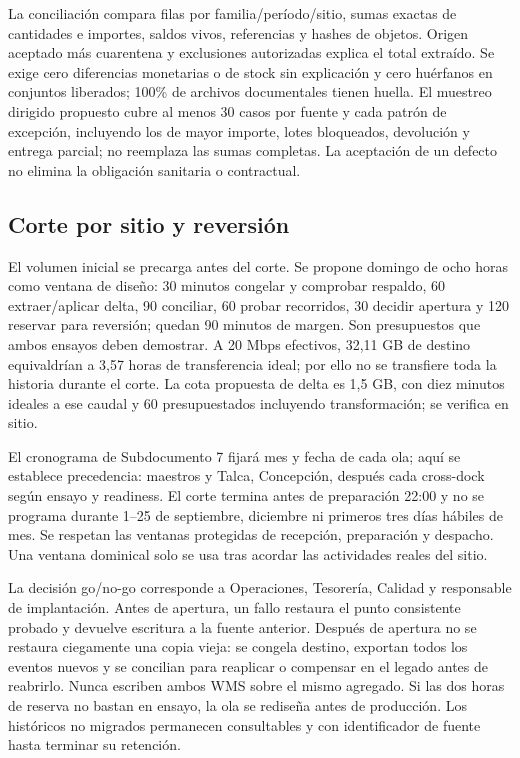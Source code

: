 La conciliación compara filas por familia/período/sitio, sumas exactas de cantidades e importes, saldos vivos, referencias y hashes de objetos. Origen aceptado más cuarentena y exclusiones autorizadas explica el total extraído. Se exige cero diferencias monetarias o de stock sin explicación y cero huérfanos en conjuntos liberados; 100\% de archivos documentales tienen huella. El muestreo dirigido propuesto cubre al menos 30 casos por fuente y cada patrón de excepción, incluyendo los de mayor importe, lotes bloqueados, devolución y entrega parcial; no reemplaza las sumas completas. La aceptación de un defecto no elimina la obligación sanitaria o contractual.

\subsection{Corte por sitio y reversión}
El volumen inicial se precarga antes del corte. Se propone domingo de ocho horas como ventana de diseño: 30 minutos congelar y comprobar respaldo, 60 extraer/aplicar delta, 90 conciliar, 60 probar recorridos, 30 decidir apertura y 120 reservar para reversión; quedan 90 minutos de margen. Son presupuestos que ambos ensayos deben demostrar. A 20 Mbps efectivos, 32,11 GB de destino equivaldrían a 3,57 horas de transferencia ideal; por ello no se transfiere toda la historia durante el corte. La cota propuesta de delta es 1,5 GB, con diez minutos ideales a ese caudal y 60 presupuestados incluyendo transformación; se verifica en sitio.

El cronograma de Subdocumento 7 fijará mes y fecha de cada ola; aquí se establece precedencia: maestros y Talca, Concepción, después cada cross-dock según ensayo y readiness. El corte termina antes de preparación 22:00 y no se programa durante 1–25 de septiembre, diciembre ni primeros tres días hábiles de mes. Se respetan las ventanas protegidas de recepción, preparación y despacho. Una ventana dominical solo se usa tras acordar las actividades reales del sitio.

La decisión go/no-go corresponde a Operaciones, Tesorería, Calidad y responsable de implantación. Antes de apertura, un fallo restaura el punto consistente probado y devuelve escritura a la fuente anterior. Después de apertura no se restaura ciegamente una copia vieja: se congela destino, exportan todos los eventos nuevos y se concilian para reaplicar o compensar en el legado antes de reabrirlo. Nunca escriben ambos WMS sobre el mismo agregado. Si las dos horas de reserva no bastan en ensayo, la ola se rediseña antes de producción. Los históricos no migrados permanecen consultables y con identificador de fuente hasta terminar su retención.
